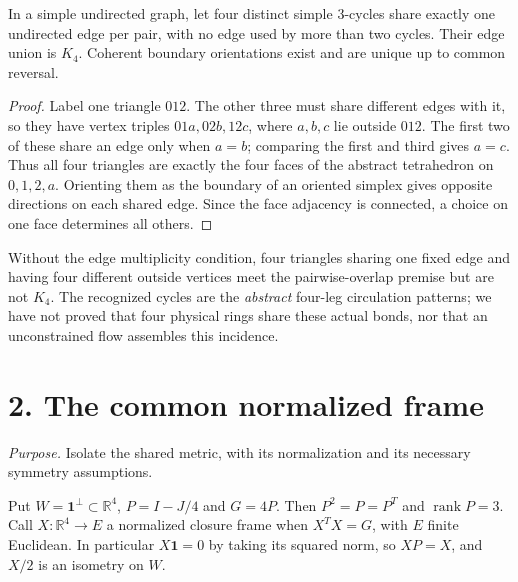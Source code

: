 \begin{theorem}\label{thm:recognition}
In a simple undirected graph, let four distinct simple $3$-cycles share exactly one undirected edge per pair, with no edge used by more than two cycles. Their edge union is $K_4$. Coherent boundary orientations exist and are unique up to common reversal.
\end{theorem}
\begin{proof}
Label one triangle $012$. The other three must share different edges with it, so they have vertex triples $01a,02b,12c$, where $a,b,c$ lie outside $012$. The first two of these share an edge only when $a=b$; comparing the first and third gives $a=c$. Thus all four triangles are exactly the four faces of the abstract tetrahedron on $0,1,2,a$. Orienting them as the boundary of an oriented simplex gives opposite directions on each shared edge. Since the face adjacency is connected, a choice on one face determines all others.
\end{proof}
Without the edge multiplicity condition, four triangles sharing one fixed edge and having four different outside vertices meet the pairwise-overlap premise but are not $K_4$. The recognized cycles are the \emph{abstract} four-leg circulation patterns; we have not proved that four physical rings share these actual bonds, nor that an unconstrained flow assembles this incidence.

\section*{2. The common normalized frame}
\textit{Purpose.} Isolate the shared metric, with its normalization and its necessary symmetry assumptions.

Put $W=\mathbf1^\perp\subset\mathbb R^4$, $P=I-J/4$ and $G=4P$. Then $P^2=P=P^T$ and $\operatorname{rank}P=3$. Call $X:\mathbb R^4\to E$ a normalized closure frame when $X^TX=G$, with $E$ finite Euclidean. In particular $X\mathbf1=0$ by taking its squared norm, so $XP=X$, and $X/2$ is an isometry on $W$.

